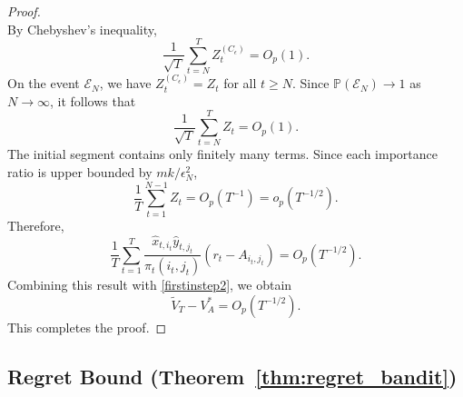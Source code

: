 \documentclass[12pt]{article}
\begin{document}
\begin{proof}
\[\]
By Chebyshev's inequality, 
\[ 
\frac{1}{\sqrt{T}} \sum_{t=N}^T Z_t^{(C_\epsilon)} = O_p(1). 
\] 
On the event $\mathcal E_N$, we have $Z_t^{(C_\epsilon)}=Z_t$ for all $t\ge N$. Since $\mathbb P(\mathcal E_N)\to 1$ as $N\to\infty$, it follows that 
\[ 
\frac{1}{\sqrt{T}} \sum_{t=N}^T Z_t = O_p(1). 
\] 
The initial segment contains only finitely many terms. Since each importance ratio is upper bounded by $mk/\epsilon_N^2$, \[ \frac{1}{T} \sum_{t=1}^{N-1}Z_t = O_p(T^{-1}) = o_p(T^{-1/2}). \] Therefore, \[ \frac{1}{T} \sum_{t=1}^T \frac{ \widehat{x}_{t,i_t}\widehat{y}_{t,j_t} }{ \pi_t(i_t,j_t) } \left( r_t-A_{i_t,j_t} \right) = O_p(T^{-1/2}). \] Combining this result with \eqref{firstinstep2}, we obtain \[ \widetilde V_T-V_A^\ast = O_p(T^{-1/2}). \]
This completes the proof.

\end{proof}


\subsection{Regret Bound (Theorem~\ref{thm:regret_bandit})}
\label{app:thm:rerget_proof}
\end{document}
